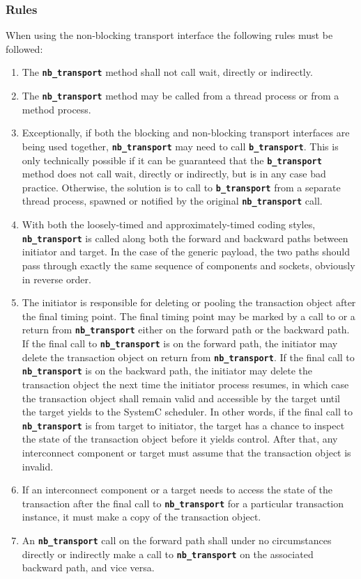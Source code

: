 {\subsubsection{Rules}
When using the non-blocking transport interface the following rules must be followed:
\begin{enumerate}
	\item The \texttt{\textbf{nb\_transport}} method shall not call wait, directly or indirectly.
	\item The \texttt{\textbf{nb\_transport}} method may be called from a thread process or from a method process.
	\item Exceptionally, if both the blocking and non-blocking transport interfaces are being used together, \texttt{\textbf{nb\_transport}} may need to call \texttt{\textbf{b\_transport}}. 
	This is only technically possible if it can be guaranteed that
the \texttt{\textbf{b\_transport}} method does not call wait, directly or indirectly, but is in any case bad practice.
	Otherwise, the solution is to call to \texttt{\textbf{b\_transport}} from a separate thread process, spawned or notified by the original \texttt{\textbf{nb\_transport}} call.
	\item With both the loosely-timed and approximately-timed coding styles, \texttt{\textbf{nb\_transport}} is called along both the forward and backward paths between initiator and target. 
	In the case of the generic payload, the two paths should pass through exactly the same sequence of components and sockets, obviously in reverse order.
	\item The initiator is responsible for deleting or pooling the transaction object after the final timing point. 
	The final timing point may be marked by a call to or a return from \texttt{\textbf{nb\_transport}} either on the forward path or the backward path. 
	If the final call to \texttt{\textbf{nb\_transport}} is on the forward path, the initiator may delete the transaction object on return from \texttt{\textbf{nb\_transport}}.
	If the final call to \texttt{\textbf{nb\_transport}} is on the backward path, the initiator may delete the transaction object the next time the initiator process resumes, in which case the transaction object shall remain valid and accessible by the target until the target yields to the SystemC scheduler. 
	In other words, if the final call to \texttt{\textbf{nb\_transport}} is from target to initiator, the target has a chance to inspect the state of the transaction object before it yields control. 
	After that, any interconnect component or target must assume that the transaction object is invalid.
	\item If an interconnect component or a target needs to access the state of the transaction after the final call to \texttt{\textbf{nb\_transport}} for a particular transaction instance, it must make a copy of the transaction object.
	\item An \texttt{\textbf{nb\_transport}} call on the forward path shall under no circumstances directly or indirectly make a call to \texttt{\textbf{nb\_transport}} on the associated backward path, and vice versa.
\end{enumerate}

}
